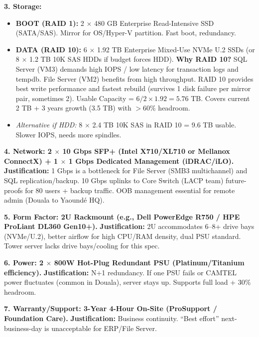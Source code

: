 \documentclass[11pt]{article}
\begin{document}
\begin{exoresolu}
\noindent\textbf{3. Storage:}
\begin{itemize}
    \item \textbf{BOOT (RAID 1):} 2 $\times$ 480 GB Enterprise Read-Intensive SSD (SATA/SAS). Mirror for OS/Hyper-V partition. Fast boot, redundancy.
    \item \textbf{DATA (RAID 10):} 6 $\times$ 1.92 TB Enterprise Mixed-Use NVMe U.2 SSDs (or 8 $\times$ 1.2 TB 10K SAS HDDs if budget forces HDD).
    \textbf{Why RAID 10?} SQL Server (VM3) demands high IOPS / low latency for transaction logs and tempdb. File Server (VM2) benefits from high throughput. RAID 10 provides best write performance and fastest rebuild (survives 1 disk failure per mirror pair, sometimes 2). Usable Capacity = $6/2 \times 1.92 = 5.76$ TB. Covers current 2 TB + 3 years growth (3.5 TB) with $> 60\%$ headroom.
    \item \textit{Alternative if HDD:} 8 $\times$ 2.4 TB 10K SAS in RAID 10 = 9.6 TB usable. Slower IOPS, needs more spindles.
\end{itemize}

\noindent\textbf{4. Network: 2 $\times$ 10 Gbps SFP+ (Intel X710/XL710 or Mellanox ConnectX) + 1 $\times$ 1 Gbps Dedicated Management (iDRAC/iLO).}
\textbf{Justification:} 1 Gbps is a bottleneck for File Server (SMB3 multichannel) and SQL replication/backup. 10 Gbps uplinks to Core Switch (LACP team) future-proofs for 80 users + backup traffic. OOB management essential for remote admin (Douala to Yaoundé HQ).

\noindent\textbf{5. Form Factor: 2U Rackmount (e.g., Dell PowerEdge R750 / HPE ProLiant DL360 Gen10+).}
\textbf{Justification:} 2U accommodates 6--8+ drive bays (NVMe/U.2), better airflow for high CPU/RAM density, dual PSU standard. Tower server lacks drive bays/cooling for this spec.

\noindent\textbf{6. Power: 2 $\times$ 800W Hot-Plug Redundant PSU (Platinum/Titanium efficiency).}
\textbf{Justification:} N+1 redundancy. If one PSU fails or CAMTEL power fluctuates (common in Douala), server stays up. Supports full load + 30\% headroom.

\noindent\textbf{7. Warranty/Support: 3-Year 4-Hour On-Site (ProSupport / Foundation Care).}
\textbf{Justification:} Business continuity. ``Best effort'' next-business-day is unacceptable for ERP/File Server.
\end{exoresolu}
\end{document}
